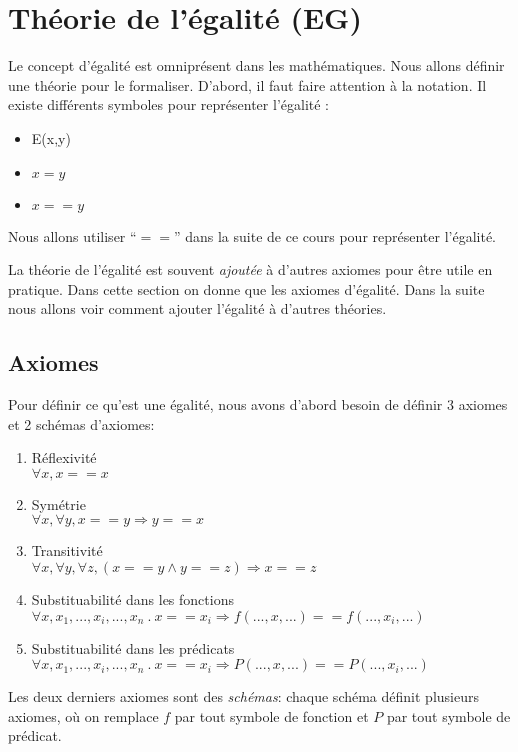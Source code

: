 
\section{Théorie de l'égalité (EG)}

Le concept d'égalité est omniprésent dans les mathématiques.
Nous allons définir une théorie pour le formaliser.
D'abord, il faut faire attention à la notation.
Il existe différents symboles pour représenter l'égalité : 
\begin{itemize}
	\item E(x,y)
	\item $x = y$
	\item $x == y $
\end{itemize}
Nous allons utiliser ``$==$'' dans la suite de ce cours pour représenter l'égalité.

La théorie de l'égalité est souvent {\em ajoutée} à d'autres axiomes pour être utile en pratique.
Dans cette section on donne que les axiomes d'égalité.  Dans la suite nous allons voir comment
ajouter l'égalité à d'autres théories.

\subsection{Axiomes} 
Pour définir ce qu'est une égalité, nous avons d'abord besoin de définir 3 axiomes et 2 schémas d'axiomes:
\begin{enumerate}
\item Réflexivité \\$\forall x, x==x$
\item Symétrie \\$\forall x, \forall y, x==y \Rightarrow y==x$
\item Transitivité \\$\forall x, \forall y, \forall z, (x==y \land y==z) \Rightarrow x==z$
\item Substituabilité dans les fonctions\\$\forall x, x_{1}, ..., x_i, ..., x_{n}\ .\ x==x_i \Rightarrow f(..., x, ...) == f(..., x_i, ...)$
\item Substituabilité dans les prédicats\\$\forall x, x_{1}, ..., x_i, ..., x_{n}\ .\ x==x_i \Rightarrow P(..., x, ...) == P(..., x_i, ...)$ 
\end{enumerate}
Les deux derniers axiomes sont des {\em schémas}: chaque schéma définit plusieurs axiomes, où on remplace $f$ par tout symbole de fonction et $P$ par tout symbole de prédicat.


